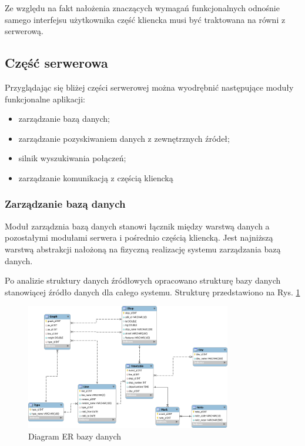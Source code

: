 \documentclass[a4paper,12pt]{article}
\begin{document}
Ze względu na fakt nałożenia znaczących wymagań funkcjonalnych odnośnie samego
interfejsu użytkownika część kliencka musi być traktowana na równi z serwerową.

\subsection{Część serwerowa}
Przyglądając się bliżej części serwerowej można wyodrębnić następujące moduły
funkcjonalne aplikacji:
\begin{itemize}
  \item zarządzanie bazą danych;
  \item zarządzanie pozyskiwaniem danych z zewnętrznych źródeł;
  \item silnik wyszukiwania połączeń;
  \item zarządzanie komunikacją z częścią kliencką
\end{itemize}
\subsubsection{Zarządzanie bazą danych}
Moduł zarządznia bazą danych stanowi łącznik między warstwą danych a
pozostałymi modułami serwera i pośrednio częścią kliencką. Jest najniższą
warstwą abstrakcji nałożoną na fizyczną realizację systemu zarządzania bazą
danych. 

Po analizie struktury danych źródłowych opracowano strukturę bazy danych
stanowiącej źródło danych dla całego systemu. Strukturę przedstawiono na Rys.
\ref{schemat_bazy_danych}

 \begin{figure}[htp]
\centering
\includegraphics[width=0.8\textwidth]{schemat_bazy_danych} 
\caption{Diagram ER bazy danych}\label{schemat_bazy_danych}
\end{figure}
\end{document}

